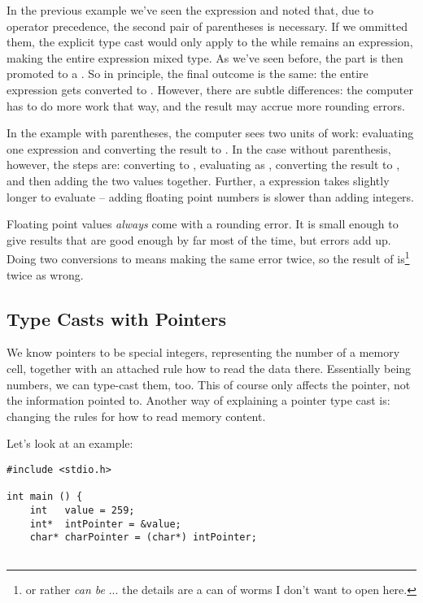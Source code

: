 {In the previous example we've seen the expression  and noted that, due to operator precedence, the second pair of parentheses is necessary. If we ommitted them, the explicit type cast would only apply to the  while  remains an  expression, making the entire expression mixed type. As we've seen before, the  part is then promoted to a . So in principle, the final outcome is the same: the entire expression gets converted to . However, there are subtle differences: the computer has to do more work that way, and the result may accrue more rounding errors.

In the example with parentheses, the computer sees two units of work: evaluating one  expression and converting the result to . In the case without parenthesis, however, the steps are: converting  to , evaluating  as , converting the result to , and then adding the two  values together. Further, a  expression takes slightly longer to evaluate -- adding floating point numbers is slower than adding integers.

Floating point values \emph{always} come with a rounding error. It is small enough to give results that are good enough by far most of the time, but errors add up. Doing two conversions to  means making the same error twice, so the result of  is\footnote{or rather \emph{can be} ... the details are a can of worms I don't want to open here.} twice as wrong.


\subsection{Type Casts with Pointers}
We know pointers to be special integers, representing the number of a memory cell, together with an attached rule how to read the data there. Essentially being numbers, we can type-cast them, too. This of course only affects the pointer, not the information pointed to. Another way of explaining a pointer type cast is: changing the rules for how to read memory content.

Let's look at an example:
\begin{codebox}[pointerCast.c]
\begin{verbatim}
#include <stdio.h>

int main () {
    int   value = 259;
    int*  intPointer = &value;
    char* charPointer = (char*) intPointer;


\end{verbatim}
\end{codebox}}
